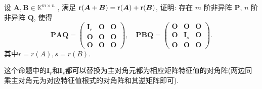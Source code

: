 \documentclass[../../main.tex]{subfiles}
\begin{document}
\begin{proposition}\label{proposition:矩阵和的秩等于秩的和可同时相抵标准化}
设 $\boldsymbol{A},\boldsymbol{B}\in \mathbb{K}^{m \times n}$ , 满足 ${\rm r}(\boldsymbol{A} + \boldsymbol{B}) = {\rm r}(\boldsymbol{A}) + {\rm r}(\boldsymbol{B})$, 证明: 存在 $m$ 阶非异阵 $\boldsymbol{P}$, $n$ 阶非异阵 $\boldsymbol{Q}$, 使得
$$
\boldsymbol{P}\boldsymbol{A}\boldsymbol{Q} = \begin{pmatrix}
\boldsymbol{I}_r & \boldsymbol{O} & \boldsymbol{O} \\
\boldsymbol{O} & \boldsymbol{O} & \boldsymbol{O} \\
\boldsymbol{O} & \boldsymbol{O} & \boldsymbol{O}
\end{pmatrix}, \quad \boldsymbol{P}\boldsymbol{B}\boldsymbol{Q} = \begin{pmatrix}
\boldsymbol{O} & \boldsymbol{O} & \boldsymbol{O} \\
\boldsymbol{O} & \boldsymbol{I}_s & \boldsymbol{O} \\
\boldsymbol{O} & \boldsymbol{O} & \boldsymbol{O}
\end{pmatrix}.
$$
其中$r=r(A),s=r(B).$
\end{proposition}
\begin{note}
这个命题中的$\boldsymbol{I}_r$和$\boldsymbol{I}_s$都可以替换为主对角元都为相应矩阵特征值的对角阵(两边同乘主对角元为对应特征值根式的对角阵和其逆矩阵即可).
\end{note}
\end{document}

